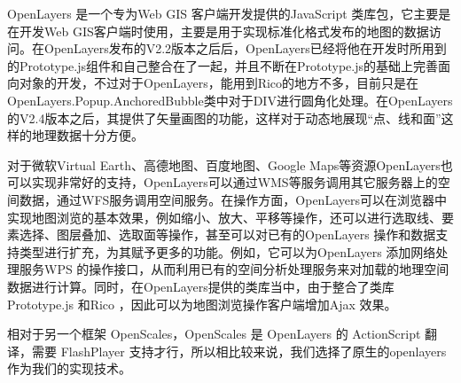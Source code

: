 OpenLayers 是一个专为Web GIS 客户端开发提供的JavaScript 类库包，它主要是在开发Web GIS客户端时使用，主要是用于实现标准化格式发布的地图的数据访问。在OpenLayers发布的V2.2版本之后后，OpenLayers已经将他在开发时所用到的Prototype.js组件和自己整合在了一起，并且不断在Prototype.js的基础上完善面向对象的开发，不过对于OpenLayers，能用到Rico的地方不多，目前只是在OpenLayers.Popup.AnchoredBubble类中对于DIV进行圆角化处理。在OpenLayers的V2.4版本之后，其提供了矢量画图的功能，这样对于动态地展现“点、线和面”这样的地理数据十分方便。

对于微软Virtual Earth、高德地图、百度地图、Google Maps等资源OpenLayers也可以实现非常好的支持，OpenLayers可以通过WMS等服务调用其它服务器上的空间数据，通过WFS服务调用空间服务。在操作方面，OpenLayers可以在浏览器中实现地图浏览的基本效果，例如缩小、放大、平移等操作，还可以进行选取线、要素选择、图层叠加、选取面等操作，甚至可以对已有的OpenLayers 操作和数据支持类型进行扩充，为其赋予更多的功能。例如，它可以为OpenLayers 添加网络处理服务WPS 的操作接口，从而利用已有的空间分析处理服务来对加载的地理空间数据进行计算。同时，在OpenLayers提供的类库当中，由于整合了类库Prototype.js 和Rico ，因此可以为地图浏览操作客户端增加Ajax 效果。

相对于另一个框架 OpenScales，OpenScales 是 OpenLayers 的 ActionScript 翻译，需要 FlashPlayer 支持才行，所以相比较来说，我们选择了原生的openlayers作为我们的实现技术。




